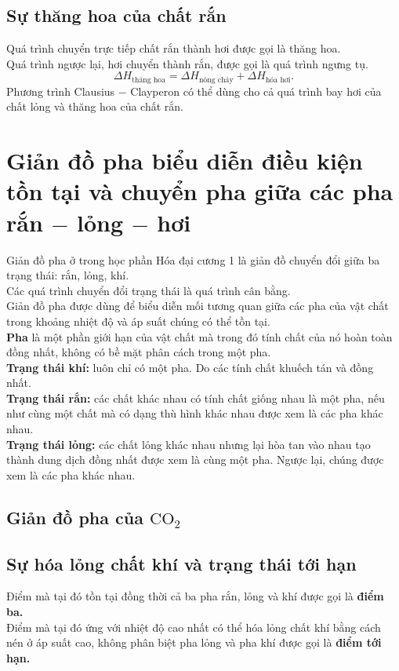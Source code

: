 \subsection{Sự thăng hoa của chất rắn}
Quá trình chuyển trực tiếp chất rắn thành hơi được gọi là thăng hoa.\\
Quá trình ngược lại, hơi chuyển thành rắn, được gọi là quá trình ngưng tụ.
$$\Delta H_{\text{thăng hoa}} = \Delta H_{\text{nóng chảy}} + \Delta H_{\text{hóa hơi}}.$$
Phương trình Clausius $-$ Clayperon có thể dùng cho cả quá trình bay hơi của chất lỏng và thăng hoa của chất rắn.
\section{Giản đồ pha biểu diễn điều kiện tồn tại và chuyển pha giữa các pha rắn $-$ lỏng $-$ hơi}
Giản đồ pha ở trong học phần Hóa đại cương 1 là giản đồ chuyển đổi giữa ba trạng thái: rắn, lỏng, khí.\\
Các quá trình chuyển đổi trạng thái là quá trình cân bằng.\\
Giản đồ pha được dùng để biểu diễn mối tương quan giữa các pha của vật chất trong khoảng nhiệt độ và áp suất chúng có thể tồn tại.\\
\textbf{Pha} là một phần giới hạn của vật chất mà trong đó tính chất của nó hoàn toàn đồng nhất, không có bề mặt phân cách trong một pha.\\
\textbf{Trạng thái khí:} luôn chỉ có một pha. Do các tính chất khuếch tán và đồng nhất.\\
\textbf{Trạng thái rắn:} các chất khác nhau có tính chất giống nhau là một pha, nếu như cùng một chất mà có dạng thù hình khác nhau được xem là các pha khác nhau.\\
\textbf{Trạng thái lỏng:} các chất lỏng khác nhau nhưng lại hòa tan vào nhau tạo thành dung dịch đồng nhất được xem là cùng một pha. Ngược lại, chúng được xem là các pha khác nhau.
\subsection{Giản đồ pha của $\mathrm{CO_2}$}
\subsection{Sự hóa lỏng chất khí và trạng thái tới hạn}
Điểm mà tại đó tồn tại đồng thời cả ba pha rắn, lỏng và khí được gọi là \textbf{điểm ba.}\\
Điểm mà tại đó ứng với nhiệt độ cao nhất có thể hóa lỏng chất khí bằng cách nén ở áp suất cao, không phân biệt pha lỏng và pha khí được gọi là \textbf{điểm tới hạn.}
